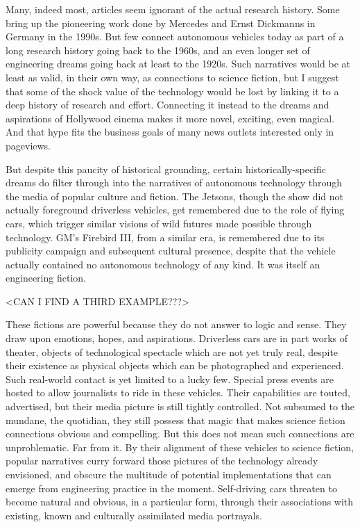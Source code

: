 Many, indeed most, articles seem ignorant of the actual research
history. Some bring up the pioneering work done by Mercedes and Ernst
Dickmanns in Germany in the 1990s.\cite{???} But few connect
autonomous vehicles today as part of a long research history going
back to the 1960s, and an even longer set of engineering dreams going
back at least to the 1920s. Such narratives would be at least as
valid, in their own way, as connections to science fiction, but I
suggest that some of the shock value of the technology would be lost
by linking it to a deep history of research and effort. Connecting it
instead to the dreams and aspirations of Hollywood cinema makes it
more novel, exciting, even magical. And that hype fits the business
goals of many news outlets interested only in pageviews.

But despite this paucity of historical grounding, certain historically-specific
dreams do filter through into the narratives of autonomous technology
through the media of popular culture and fiction. The Jetsons, though
the show did not actually foreground driverless vehicles, get
remembered due to the role of flying cars, which trigger similar visions of wild
futures made possible through technology.\cite{???} GM's Firebird III, from a
similar era, is remembered due to its publicity campaign and
subsequent cultural presence,\cite{???-http://www.fool.com/investing/general/2013/12/22/google-vs-tesla-vs-ford-who-has-the-best-self-driv.aspx} despite that the vehicle actually
contained no autonomous technology of any kind.\cite[p. ???]{wetmore} It was
itself an engineering fiction. 

<CAN I FIND A THIRD EXAMPLE???>

These fictions are powerful because they do not answer to logic and
sense. They draw upon emotions, hopes, and aspirations. Driverless cars
are in part works of theater, objects of technological spectacle which
are not yet truly real, despite their existence as physical objects
which can be photographed and experienced. Such real-world contact is
yet limited to a lucky few. Special press events are hosted to allow journalists
to ride in these vehicles.\cite{???} Their capabilities are touted,
advertised, but their media picture is still tightly controlled. Not subsumed
to the mundane, the quotidian, they still possess that magic that
makes science fiction connections obvious and compelling. But this
does not mean such connections are unproblematic. Far from it. By
their alignment of these vehicles to science fiction, popular
narratives curry forward those pictures of the technology already
envisioned, and obscure the multitude of potential implementations
that can emerge from engineering practice in the moment. Self-driving
cars threaten to become natural and obvious, in a particular form,
through their associations with existing, known and culturally
assimilated media portrayals.

